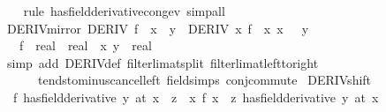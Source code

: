 \begin{isabellebody}
%
\isadelimproof
\ \ %
\endisadelimproof
%
\isatagproof
{}\isamarkupfalse%
\ {\isacharparenleft}{\kern0pt}rule\ has{\isacharunderscore}{\kern0pt}field{\isacharunderscore}{\kern0pt}derivative{\isacharunderscore}{\kern0pt}cong{\isacharunderscore}{\kern0pt}ev{\isacharparenright}{\kern0pt}\ simp{\isacharunderscore}{\kern0pt}all%
\endisatagproof
{\isafoldproof}%
%
\isadelimproof
\isanewline
%
\endisadelimproof
\isanewline
{}\isamarkupfalse%
\ DERIV{\isacharunderscore}{\kern0pt}mirror{\isacharcolon}{\kern0pt}\ {\isachardoublequoteopen}{\isacharparenleft}{\kern0pt}DERIV\ f\ {\isacharparenleft}{\kern0pt}{\isacharminus}{\kern0pt}\ x{\isacharparenright}{\kern0pt}\ {\isacharcolon}{\kern0pt}{\isachargreater}{\kern0pt}\ y{\isacharparenright}{\kern0pt}\ {\isasymlongleftrightarrow}\ {\isacharparenleft}{\kern0pt}DERIV\ {\isacharparenleft}{\kern0pt}{\isasymlambda}x{\isachardot}{\kern0pt}\ f\ {\isacharparenleft}{\kern0pt}{\isacharminus}{\kern0pt}\ x{\isacharparenright}{\kern0pt}{\isacharparenright}{\kern0pt}\ x\ {\isacharcolon}{\kern0pt}{\isachargreater}{\kern0pt}\ {\isacharminus}{\kern0pt}\ y{\isacharparenright}{\kern0pt}{\isachardoublequoteclose}\isanewline
\ \ \ f\ {\isacharcolon}{\kern0pt}{\isacharcolon}{\kern0pt}\ {\isachardoublequoteopen}real\ {\isasymRightarrow}\ real{\isachardoublequoteclose}\ \ x\ y\ {\isacharcolon}{\kern0pt}{\isacharcolon}{\kern0pt}\ real\isanewline
%
\isadelimproof
\ \ %
\endisadelimproof
%
\isatagproof
{}\isamarkupfalse%
\ {\isacharparenleft}{\kern0pt}simp\ add{\isacharcolon}{\kern0pt}\ DERIV{\isacharunderscore}{\kern0pt}def\ filterlim{\isacharunderscore}{\kern0pt}at{\isacharunderscore}{\kern0pt}split\ filterlim{\isacharunderscore}{\kern0pt}at{\isacharunderscore}{\kern0pt}left{\isacharunderscore}{\kern0pt}to{\isacharunderscore}{\kern0pt}right\isanewline
\ \ \ \ \ \ tendsto{\isacharunderscore}{\kern0pt}minus{\isacharunderscore}{\kern0pt}cancel{\isacharunderscore}{\kern0pt}left\ field{\isacharunderscore}{\kern0pt}simps\ conj{\isacharunderscore}{\kern0pt}commute{\isacharparenright}{\kern0pt}%
\endisatagproof
{\isafoldproof}%
%
\isadelimproof
\isanewline
%
\endisadelimproof
\isanewline
{}\isamarkupfalse%
\ DERIV{\isacharunderscore}{\kern0pt}shift{\isacharcolon}{\kern0pt}\isanewline
\ \ {\isachardoublequoteopen}{\isacharparenleft}{\kern0pt}f\ has{\isacharunderscore}{\kern0pt}field{\isacharunderscore}{\kern0pt}derivative\ y{\isacharparenright}{\kern0pt}\ {\isacharparenleft}{\kern0pt}at\ {\isacharparenleft}{\kern0pt}x\ {\isacharplus}{\kern0pt}\ z{\isacharparenright}{\kern0pt}{\isacharparenright}{\kern0pt}\ {\isacharequal}{\kern0pt}\ {\isacharparenleft}{\kern0pt}{\isacharparenleft}{\kern0pt}{\isasymlambda}x{\isachardot}{\kern0pt}\ f\ {\isacharparenleft}{\kern0pt}x\ {\isacharplus}{\kern0pt}\ z{\isacharparenright}{\kern0pt}{\isacharparenright}{\kern0pt}\ has{\isacharunderscore}{\kern0pt}field{\isacharunderscore}{\kern0pt}derivative\ y{\isacharparenright}{\kern0pt}\ {\isacharparenleft}{\kern0pt}at\ x{\isacharparenright}{\kern0pt}{\isachardoublequoteclose}\isanewline

\end{isabellebody}
